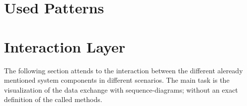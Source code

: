 \documentclass{book}
\begin{document}
\chapter{Used Patterns}
\chapter{Interaction Layer}
The following section attends to the interaction between the different aleready mentioned system components in different scenarios. The main task is the visualization of the data exchange with sequence-diagrams; without an exact definition of the called methods.
 
\end{document}

